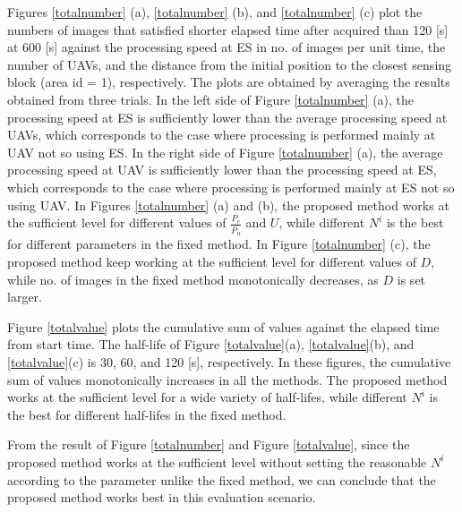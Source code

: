 \documentclass{ieeeaccess}
\begin{document}
Figures \ref{totalnumber} (a), \ref{totalnumber} (b), and \ref{totalnumber} (c) plot the numbers of images that satisfied shorter elapsed time after acquired than 120 [s] at 600 [s] against the processing speed at ES in no. of images per unit time, the number of UAVs, and the distance from the initial position to the closest sensing block (area id = 1), respectively.
The plots are obtained by averaging the results obtained from three trials.
In the left side of Figure \ref{totalnumber} (a), the processing speed at ES is sufficiently lower than the average processing speed at UAVs, which corresponds to the case where processing is performed mainly at UAV not so using ES.
In the right side of Figure \ref{totalnumber} (a), the average processing speed at UAV is sufficiently lower than the processing speed at ES, which corresponds to the case where processing is performed mainly at ES not so using UAV.
In Figures \ref{totalnumber} (a) and (b), the proposed method works at the sufficient level for different values of $\frac{P_e}{\overline{P_u}}$ and $U$, while different $N^i$ is the best for different parameters in the fixed method.
In Figure \ref{totalnumber} (c), the proposed method keep working at the sufficient level for different values of $D$, while no. of images in the fixed method monotonically decreases, as $D$ is set larger.

Figure \ref{totalvalue} plots the cumulative sum of values against the elapsed time from start time.
The half-life of Figure \ref{totalvalue}(a), \ref{totalvalue}(b), and \ref{totalvalue}(c) is 30, 60, and 120 [s], respectively.
In these figures, the cumulative sum of values monotonically increases in all the methods.
The proposed method works at the sufficient level for a wide variety of half-lifes, while different $N^i$ is the best for different half-lifes in the fixed method.

From the result of Figure \ref{totalnumber} and Figure \ref{totalvalue}, since the proposed method works at the sufficient level without setting the reasonable $N^i$ according to the parameter unlike the fixed method, we can conclude that the proposed method works best in this evaluation scenario.
\end{document}
